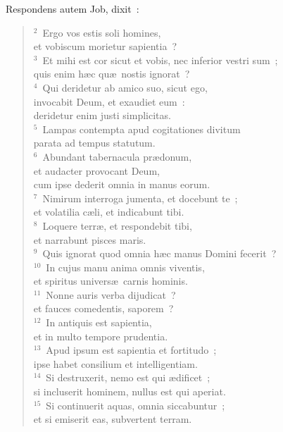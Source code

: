 \lettrine[lines=3,image=true,loversize=0.05,lraise=-0.03]{R}{}espondens autem Job, dixit~:
\begin{flushleft}\begin{verse}\vspace{6pt}${}^{2}$~Ergo vos estis soli homines,\\ et vobiscum morietur sapientia~?\\
${}^{3}$~Et mihi est cor sicut et vobis, nec inferior vestri sum~;\\ quis enim h\ae c qu\ae\ nostis ignorat~?\\
${}^{4}$~Qui deridetur ab amico suo, sicut ego,\\ invocabit Deum, et exaudiet eum~:\\ deridetur enim justi simplicitas.\\
${}^{5}$~Lampas contempta apud cogitationes divitum\\ parata ad tempus statutum.\\
${}^{6}$~Abundant tabernacula pr\ae donum,\\ et audacter provocant Deum,\\ cum ipse dederit omnia in manus eorum.\\
${}^{7}$~Nimirum interroga jumenta, et docebunt te~;\\ et volatilia c\ae li, et indicabunt tibi.\\
${}^{8}$~Loquere terr\ae , et respondebit tibi,\\ et narrabunt pisces maris.\\
${}^{9}$~Quis ignorat quod omnia h\ae c manus Domini fecerit~?\\
${}^{10}$~In cujus manu anima omnis viventis,\\ et spiritus univers\ae\ carnis hominis.\\
${}^{11}$~Nonne auris verba dijudicat~?\\ et fauces comedentis, saporem~?\\
${}^{12}$~In antiquis est sapientia,\\ et in multo tempore prudentia.\\
${}^{13}$~Apud ipsum est sapientia et fortitudo~;\\ ipse habet consilium et intelligentiam.\\
${}^{14}$~Si destruxerit, nemo est qui \ae dificet~;\\ si incluserit hominem, nullus est qui aperiat.\\
${}^{15}$~Si continuerit aquas, omnia siccabuntur~;\\ et si emiserit eas, subvertent terram.\\

\end{verse}
\end{flushleft}

